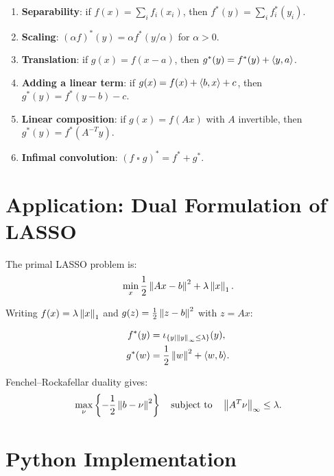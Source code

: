 \begin{proposition}
\begin{enumerate}
    \item \textbf{Separability}: if $f(x) = \sum_i f_i(x_i)$, then
          $f^*(y) = \sum_i f_i^*(y_i)$.
    \item \textbf{Scaling}: $(\alpha f)^*(y) = \alpha f^*(y/\alpha)$ for $\alpha > 0$.
    \item \textbf{Translation}: if $g(x) = f(x - a)$, then $g^*(y) = f^*(y) + \langle y, a \rangle$.
    \item \textbf{Adding a linear term}: if $g(x) = f(x) + \langle b, x \rangle + c$,
          then $g^*(y) = f^*(y - b) - c$.
    \item \textbf{Linear composition}: if $g(x) = f(Ax)$ with $A$ invertible,
          then $g^*(y) = f^*(A^{-T}y)$.
    \item \textbf{Infimal convolution}: $(f \mathop{\square} g)^* = f^* + g^*$.
\end{enumerate}
\end{proposition}

\section{Application: Dual Formulation of LASSO}

The primal LASSO problem is:
\[
    \min_x \frac{1}{2}\left\| Ax - b \right\|^2 + \lambda\left\| x \right\|_1.
\]

Writing $f(x) = \lambda\left\| x \right\|_1$ and $g(z) = \frac{1}{2}\left\| z - b \right\|^2$ with $z = Ax$:

\begin{align*}
    f^*(y) &= \iota_{\{y \mid \left\| y \right\|_\infty \leq \lambda\}}(y), \\
    g^*(w) &= \frac{1}{2}\left\| w \right\|^2 + \langle w, b \rangle.
\end{align*}

Fenchel--Rockafellar duality gives:
\[
    \max_\nu \left\{-\frac{1}{2}\left\| b - \nu \right\|^2\right\}
    \quad \text{subject to} \quad \left\| A^T\nu \right\|_\infty \leq \lambda.
\]

\section{Python Implementation}

